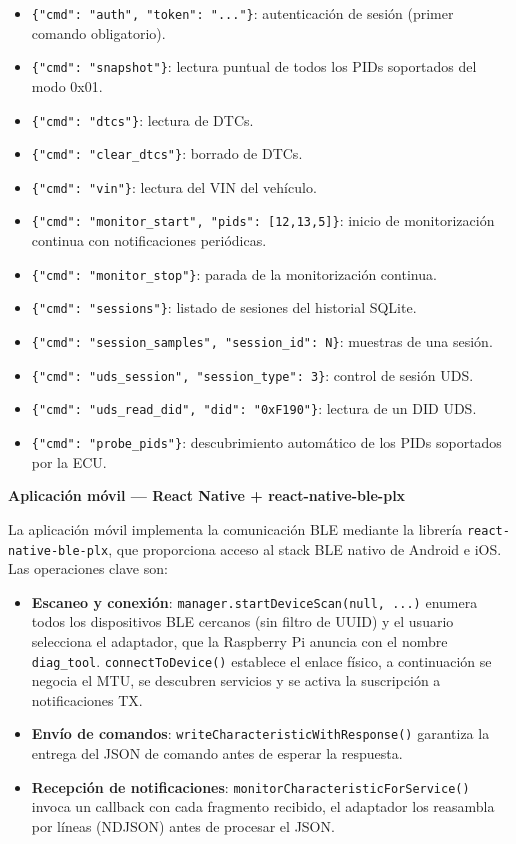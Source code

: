 \begin{itemize}
    \item \verb|{"cmd": "auth", "token": "..."}|: autenticación de sesión (primer comando obligatorio).
    \item \verb|{"cmd": "snapshot"}|: lectura puntual de todos los PIDs soportados del modo 0x01.
    \item \verb|{"cmd": "dtcs"}|: lectura de DTCs.
    \item \verb|{"cmd": "clear_dtcs"}|: borrado de DTCs.
    \item \verb|{"cmd": "vin"}|: lectura del VIN del vehículo.
    \item \verb|{"cmd": "monitor_start", "pids": [12,13,5]}|: inicio de monitorización continua con notificaciones periódicas.
    \item \verb|{"cmd": "monitor_stop"}|: parada de la monitorización continua.
    \item \verb|{"cmd": "sessions"}|: listado de sesiones del historial SQLite.
    \item \verb|{"cmd": "session_samples", "session_id": N}|: muestras de una sesión.
    \item \verb|{"cmd": "uds_session", "session_type": 3}|: control de sesión UDS.
    \item \verb|{"cmd": "uds_read_did", "did": "0xF190"}|: lectura de un DID UDS.
    \item \verb|{"cmd": "probe_pids"}|: descubrimiento automático de los PIDs soportados por la ECU.
\end{itemize}

\medskip
\noindent\textbf{Aplicación móvil — React Native + react-native-ble-plx}

La aplicación móvil implementa la comunicación BLE mediante la librería \texttt{react-\allowbreak{}native-\allowbreak{}ble-\allowbreak{}plx}, que proporciona acceso al stack BLE nativo de Android e iOS. Las operaciones clave son:

\begin{itemize}
    \item \textbf{Escaneo y conexión}: \texttt{manager.startDeviceScan(null, ...)} enumera todos los dispositivos BLE cercanos (sin filtro de UUID) y el usuario selecciona el adaptador, que la Raspberry Pi anuncia con el nombre \texttt{diag\_tool}. \texttt{connectToDevice()} establece el enlace físico, a continuación se negocia el MTU, se descubren servicios y se activa la suscripción a notificaciones TX.
    \item \textbf{Envío de comandos}: \texttt{write\allowbreak{}Characteristic\allowbreak{}With\allowbreak{}Response()} garantiza la entrega del JSON de comando antes de esperar la respuesta.
    \item \textbf{Recepción de notificaciones}: \texttt{monitorCharacteristicForService()} invoca un callback con cada fragmento recibido, el adaptador los reasambla por líneas (NDJSON) antes de procesar el JSON.
\end{itemize}


